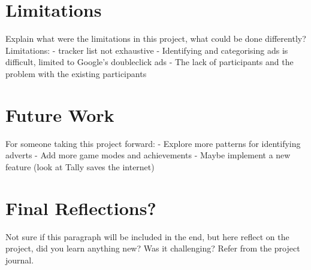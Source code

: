 \documentclass{l4proj}
\begin{document}
\section{Limitations}
Explain what were the limitations in this project, what could be done differently? 
Limitations:
 - tracker list not exhaustive
 - Identifying and categorising ads is difficult, limited to Google's doubleclick ads
 - The lack of participants and the problem with the existing participants

\section{Future Work}
For someone taking this project forward:
 - Explore more patterns for identifying adverts
 - Add more game modes and achievements
 - Maybe implement a new feature (look at Tally saves the internet)

\section{Final Reflections?}
Not sure if this paragraph will be included in the end, but here reflect on the project, did you learn anything new? Was it challenging? Refer from the project journal.

%
% 
\end{document}
